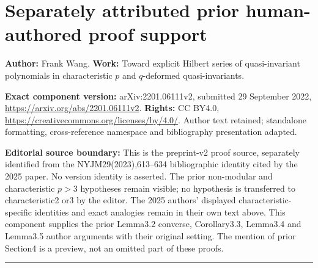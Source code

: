 \documentclass[11pt]{article}
\numberwithin{equation}{section}
\theoremstyle{definition}
\numberwithin{equation}{section}
\begin{document}
\section*{Separately attributed prior human-authored proof support}
\noindent\textbf{Author:} Frank Wang. \textbf{Work:} Toward explicit Hilbert series of quasi-invariant polynomials in characteristic $p$ and $q$-deformed quasi-invariants.\par
\noindent\textbf{Exact component version:} arXiv:2201.06111v2, submitted 29 September 2022, \url{https://arxiv.org/abs/2201.06111v2}. \textbf{Rights:} CC BY4.0, \url{https://creativecommons.org/licenses/by/4.0/}. Author text retained; standalone formatting, cross-reference namespace and bibliography presentation adapted.\par
\noindent\textbf{Editorial source boundary:} This is the preprint-v2 proof source, separately identified from the NYJM29(2023),613--634 bibliographic identity cited by the 2025 paper. No version identity is asserted. The prior non-modular and characteristic $p>3$ hypotheses remain visible; no hypothesis is transferred to characteristic2 or3 by the editor. The 2025 authors' displayed characteristic-specific identities and exact analogies remain in their own text above. This component supplies the prior Lemma3.2 converse, Corollary3.3, Lemma3.4 and Lemma3.5 author arguments with their original setting. The mention of prior Section4 is a preview, not an omitted part of these proofs.\par
\medskip\hrule\medskip
\begingroup
\theoremstyle{plain}
\newtheorem{theorem}{Theorem}[section]
\newtheorem{corollary}[theorem]{Corollary}
\newtheorem{lemma}[theorem]{Lemma}
\newtheorem{proposition}[theorem]{Proposition}
\newtheorem{conjecture}[theorem]{Conjecture}

\theoremstyle{definition}
\newtheorem{definition}[theorem]{Definition}
\newtheorem{example}[theorem]{Example}
\newtheorem{remark}[theorem]{Remark}

\setcounter{section}{1}
\let\WangOriginalLabel\label
\let\WangOriginalRef\ref
\let\WangOriginalEqref\eqref
\let\WangOriginalCite\cite
\makeatletter\let\WangOriginalDisplayLabel{}\makeatother
\renewcommand{\label}[1]{\WangOriginalLabel{wangv2:#1}}
\renewcommand{\ref}[1]{\WangOriginalRef{wangv2:#1}}
\renewcommand{\eqref}[1]{\WangOriginalEqref{#1}}
\renewcommand{\cite}[1]{\WangOriginalCite{wangv2:#1}}
\renewcommand{\char}{\text{char\,}}
\end{document}
